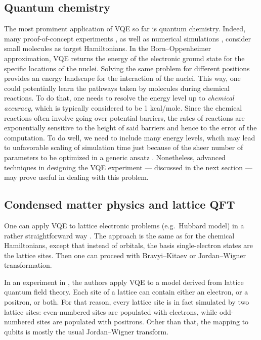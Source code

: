 \subsection{Quantum chemistry}
The most prominent application of VQE so far is quantum chemistry. Indeed, many proof-of-concept experiments \cite{peruzzo_variational_2014,omalley_scalable_2016,kandala_hardware-efficient_2017,hempel_quantum_2018,shen_quantum_2017}, as well as numerical simulations \cite{parrish_quantum_2019,romero_strategies_2017}, consider small molecules as target Hamiltonians. In the Born--Oppenheimer approximation, VQE returns the energy of the electronic ground state for the specific locations of the nuclei. Solving the same problem for different positions provides an energy landscape for the interaction of the nuclei. This way, one could potentially learn the pathways taken by molecules during chemical reactions. To do that, one needs to resolve the energy level up to \textit{chemical accuracy}, which is typically considered to be 1 kcal/mole. Since the chemical reactions often involve going over potential barriers, the rates of reactions are exponentially sensitive to the height of said barriers and hence to the error of the computation. To do well, we need to include many energy levels, whcih may lead to unfavorable scaling of simulation time just because of the sheer number of parameters to be optimized in a generic ansatz \cite{elfving_how_2020}. Nonetheless, advanced techniques in designing the VQE experiment --- discussed in the next section --- may prove useful in dealing with this problem.

\subsection{Condensed matter physics and lattice QFT}

One can apply VQE to lattice electronic problems (e.g.~Hubbard model) in a rather straightforward way \cite{cade_strategies_2019,uvarov_variational_2020}. The approach is the same as for the chemical Hamiltonians, except that instead of orbitals, the basis single-electron states are the lattice sites. Then one can proceed with Bravyi--Kitaev or Jordan--Wigner transformation.

In an experiment in \cite{kokail_self-verifying_2019}, the authors apply VQE to a model derived from lattice quantum field theory. Each site of a lattice can contain either an electron, or a positron, or both. For that reason, every lattice site is in fact simulated by two lattice sites: even-numbered sites are populated with electrons, while odd-numbered sites are populated with positrons. Other than that, the mapping to qubits is mostly the usual Jordan--Wigner transform.

